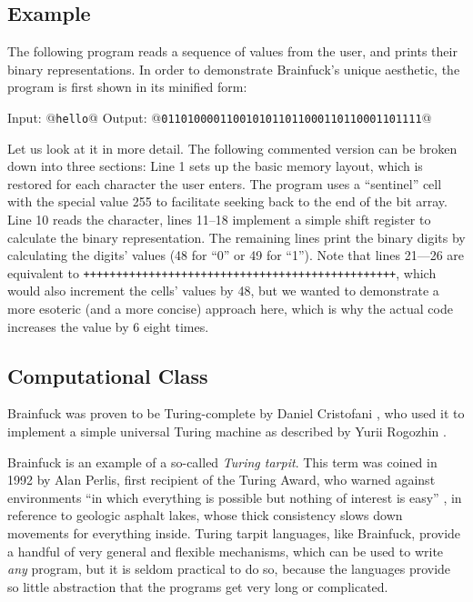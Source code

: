 \subsection{Example}

The following program reads a sequence of \ascii{} values from the user, and prints their binary representations. In order to demonstrate Brainfuck's unique aesthetic, the program is first shown in its minified form:



\begin{io}
Input: @\texttt{hello}@
Output: @\texttt{0110100001100101011011000110110001101111}@
\end{io}

Let us look at it in more detail. The following commented version can be broken down into three sections: Line 1 sets up the basic memory layout, which is restored for each character the user enters. The program uses a “sentinel” cell with the special value 255 to facilitate seeking back to the end of the bit array. Line 10 reads the character, lines 11--18 implement a simple shift register to calculate the binary representation. The remaining lines print the binary digits by calculating the digits' \ascii{} values (48 for “0” or 49 for “1”). Note that lines 21---26 are equivalent to \texttt{++++++++++++++++++++++++++++++++++++++++++++++++}, which would also increment the cells' values by 48, but we wanted to demonstrate a more esoteric (and a more concise) approach here, which is why the actual code increases the value by 6 eight times.




\subsection{Computational Class}

Brainfuck was proven to be Turing-complete by Daniel Cristofani \cite{cristofani_universal}, who used it to implement a simple universal Turing machine as described by Yurii Rogozhin \cite{rogozhin1996small}.

Brainfuck is an example of a so-called \emph{Turing tarpit}. This term was coined in 1992 by Alan Perlis, first recipient of the Turing Award, who warned against environments “in which everything is possible but nothing of interest is easy” \cite{perlis1982epigrams}, in reference to geologic asphalt lakes, whose thick consistency slows down movements for everything inside. Turing tarpit languages, like Brainfuck, provide a handful of very general and flexible mechanisms, which can be used to write \emph{any} program, but it is seldom practical to do so, because the languages provide so little abstraction that the programs get very long or complicated.

